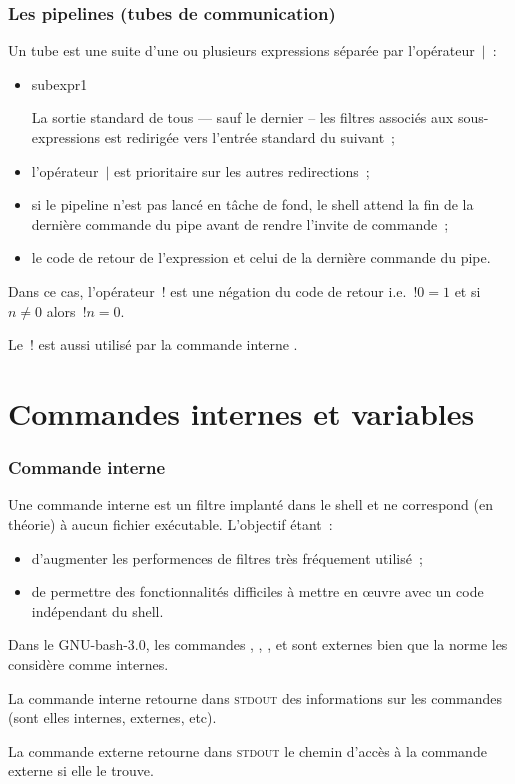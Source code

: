 \begin{frame}
  \frametitle{Les pipelines (tubes de communication)}%
  Un tube est une suite d'une ou plusieurs expressions s\'epar\'ee par
  l'op\'erateur~$|$~:
  \begin{itemize}
  \item \optionnel{!} subexpr1 
    \par
    La sortie standard de tous --- sauf le dernier -- les filtres
    associ\'es aux sous-expressions est redirig\'ee vers l'entr\'ee
    standard du suivant~;
  \item l'op\'erateur~$|$ est prioritaire sur les autres
    redirections~;
  \item si le pipeline n'est pas lanc\'e en t\^ache de fond, le shell
    attend la fin de la derni\`ere commande du pipe avant de rendre
    l'invite de commande~;
  \item le code de retour de l'expression et celui de la derni\`ere
    commande du pipe.
  \end{itemize}
  Dans ce cas, l'op\'erateur~! est une n\'egation du code de retour
  i.e.~${!0=1}$ et si~${n\not =0}$ alors~${!n=0}$.
  \par
  Le~! est aussi utilis\'e par la commande interne .
  \end{frame}
\section{Commandes internes et variables}%
\begin{frame}
\frametitle{Commande interne}
  Une commande interne est un filtre implant\'e dans le shell et ne
  correspond (en th\'eorie) \`a aucun fichier ex\'ecutable. L'objectif
  \'etant~:
  \begin{itemize}
  \item d'augmenter les performences de filtres tr\`es fr\'equement
    utilis\'e~;
  \item de permettre des fonctionnalit\'es difficiles \`a mettre en
    \oe{}uvre avec un code ind\'ependant du shell.
  \end{itemize}
  Dans le GNU-bash-3.0, les commandes ,
  , ,  et
   sont externes bien que la norme les consid\`ere
  comme internes.
  \par\smallskip
  La commande interne  retourne dans \textsc{stdout}
  des informations sur les commandes (sont elles internes, externes,
  etc).
  \par\smallskip
  La commande externe  retourne dans
  \textsc{stdout} le chemin d'acc\`es \`a la commande externe
   si elle le trouve.
\end{frame}
